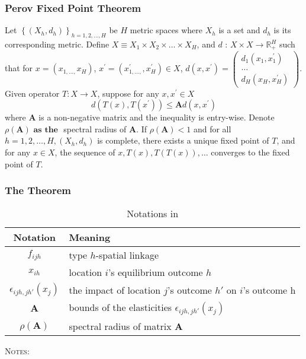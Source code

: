 \subsubsection{Perov Fixed Point Theorem}
Let $\left\{\left(X_h, d_h\right)\right\}_{h=1,2, \ldots, H}$ be $H$ metric spaces 
where $X_h$ is a set and $d_h$ is its corresponding metric. 
Define $X \equiv X_1 \times X_2 \times \ldots \times X_H$, 
and $d$ : $X \times X \rightarrow \mathbb{R}_{+}^H$ such that 
for $x=\left(x_{1, \ldots,} x_H\right)$, 
$x^{\prime}=\left(x_{1, \ldots,}^{\prime}, x_H^{\prime}\right) \in X$, 
$d\left(x, x^{\prime}\right)=\left(\begin{array}{c}d_1\left(x_1, x_1^{\prime}\right) \\ \ldots \\ d_H\left(x_H, x_H^{\prime}\right)\end{array}\right)$. 
Given operator $T: X \rightarrow X$, suppose for any $x, x^{\prime} \in X$
$$
d\left(T(x), T\left(x^{\prime}\right)\right) \leq \mathbf{A} d\left(x, x^{\prime}\right)
$$
where $\mathbf{A}$ is a non-negative matrix and the inequality is entry-wise. 
Denote $\rho \mathbf{( \mathbf { A } ) \text { as the }}$ spectral radius of $\mathbf{A}$. If $\rho(\mathbf{A})<1$ 
and for all $h=1,2, \ldots, H,\left(X_h, d_h\right)$ is complete, 
there exists a unique fixed point of $T$, 
and for any $x \in X$, the sequence of $x, T(x), T(T(x)), \ldots$ 
converges to the fixed point of $T$.

\subsubsection{The Theorem}

\begin{table}[h]
    \caption{Notations in \cite{Allen:2024}}
        \centering
        \begin{tabular}{c l} \toprule
            Notation & Meaning \\ \hline
            $f_{ijh}$ & type $h$-spatial linkage \\
            $x_{ih}$ & location $i$'s equilibrium outcome $h$ \\
            $\epsilon_{ijh,jh'}(x_{j})$ & the impact of location $j$'s outcome $h'$ on $i$'s outcome h \\
            $\mathbf{A}$ & bounds of the elasticities $\epsilon_{ijh,jh'}(x_{j})$ \\
            $\rho(\mathbf{A})$ & spectral radius of matrix $\mathbf{A}$ \\
            \bottomrule
        \end{tabular}
        \begin{minipage}{0.6\textwidth}{\footnotesize
            \textsc{Notes}:}
        \end{minipage}
\end{table}

